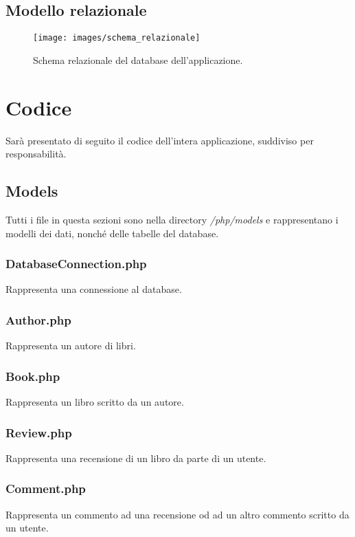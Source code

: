 \documentclass[italian]{article}
\begin{document}
\subsection{Modello relazionale}
\begin{figure}[h]
	\centering
	\texttt{[image: images/schema\_relazionale]}
	\caption[Schema relazionale]{Schema relazionale del database dell'applicazione.}
	\label{fig:schemarelazionale}
\end{figure}
\pagebreak
\section{Codice}
Sarà presentato di seguito il codice dell'intera applicazione, suddiviso per responsabilità.


\subsection{Models}
Tutti i file in questa sezioni sono nella directory \textit{/php/models} e rappresentano i modelli dei dati, nonché delle tabelle del database.

\subsubsection{DatabaseConnection.php}
Rappresenta una connessione al database.


\subsubsection{Author.php}
Rappresenta un autore di libri.


\subsubsection{Book.php}
Rappresenta un libro scritto da un autore.


\subsubsection{Review.php}
Rappresenta una recensione di un libro da parte di un utente.


\subsubsection{Comment.php}
Rappresenta un commento ad una recensione od ad un altro commento scritto da un utente.

\end{document}
